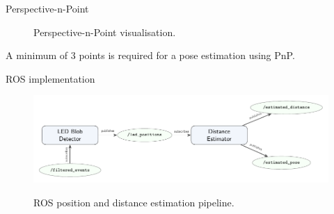 \documentclass{beamer}
\begin{document}

\begin{frame}{Perspective-n-Point}

\begin{figure}[H]
    \centering
    \hspace{1em}%
    \label{fig:pnp}
    \caption{Perspective-n-Point visualisation.}
\end{figure}

A minimum of 3 points is required for a pose estimation using PnP.

\end{frame}


\begin{frame}{ROS implementation}

    \begin{figure}
        \centering
        \includegraphics[width=1.0\textwidth]{../fig/tikz/rosflow.pdf}
        \label{fig:ros}
        \caption{ROS position and distance estimation pipeline.}
    \end{figure}

\end{frame}
\end{document}
